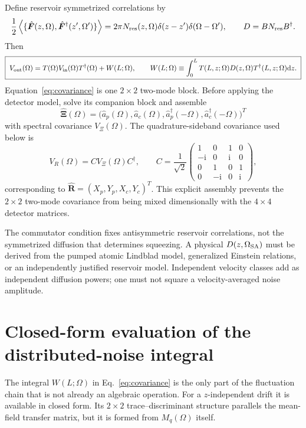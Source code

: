 \documentclass[11pt,a4paper]{article}
\newcommand{\dd}{\mathrm d}
\newcommand{\ii}{\mathrm i}
\begin{document}
Define reservoir symmetrized correlations by
\[
\frac12\left\langle
\{\hat{\bm F}(z,\Omega),\hat{\bm F}^\dagger(z',\Omega')\}\right\rangle
=2\pi N_{\rm res}(z,\Omega)\delta(z-z')\delta(\Omega-\Omega'),
\qquad D=BN_{\rm res}B^\dagger .
\]
Then
\begin{equation}
\boxed{\;
V_{\rm out}(\Omega)=
T(\Omega)V_{\rm in}(\Omega)T^\dagger(\Omega)
+W(L;\Omega),\qquad
W(L;\Omega)\equiv\int_0^L T(L,z;\Omega)D(z,\Omega)T^\dagger(L,z;\Omega)\dd z .\;}
\label{eq:covariance}
\end{equation}
Equation~\eqref{eq:covariance} is one $2\times2$ two-mode block. Before applying
the detector model, solve its companion block and assemble
\[
\hat{\bm\Xi}(\Omega)=
\bigl(\hat a_p(\Omega),\hat a_c(\Omega),
\hat a_p^\dagger(-\Omega),\hat a_c^\dagger(-\Omega)\bigr)^T
\]
with spectral covariance $V_\Xi(\Omega)$. The quadrature-sideband covariance
used below is
\begin{equation}
V_R(\Omega)=CV_\Xi(\Omega)C^\dagger,\qquad
C=\frac1{\sqrt2}
\begin{pmatrix}
1&0&1&0\\
-\ii&0&\ii&0\\
0&1&0&1\\
0&-\ii&0&\ii
\end{pmatrix},
\label{eq:nambu-quadrature}
\end{equation}
corresponding to $\hat{\bm R}=(X_p,Y_p,X_c,Y_c)^T$. This explicit assembly
prevents the $2\times2$ two-mode covariance from being mixed dimensionally with
the $4\times4$ detector matrices.

The commutator condition fixes antisymmetric reservoir correlations, not the
symmetrized diffusion that determines squeezing. A physical
$D(z,\Omega_{\rm SA})$ must be derived from the pumped atomic Lindblad model,
generalized Einstein relations, or an independently justified reservoir
model. Independent velocity classes add as independent diffusion powers;
one must not square a velocity-averaged noise amplitude.

\section{Closed-form evaluation of the distributed-noise integral}
\label{sec:lyapunov}

The integral $W(L;\Omega)$ in Eq.~\eqref{eq:covariance} is the only part of
the fluctuation chain that is not already an algebraic operation. For a
$z$-independent drift it is available in closed form. Its $2\times2$
trace--discriminant structure parallels the mean-field transfer matrix, but it
is formed from $M_q(\Omega)$ itself.
\end{document}
